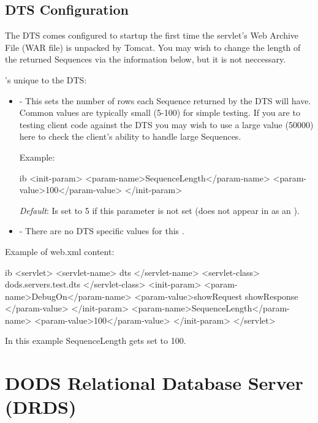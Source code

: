 \documentclass{dods-book}
\begin{document}

\subsection {DTS Configuration}

The DTS comes configured to startup the first time the servlet's Web Archive File 
(WAR file) is unpacked by Tomcat. You may wish to change the length of the 
returned Sequences via the information below, but it is not neccessary.

's unique to the DTS:


\begin{itemize}

\item {} - This  sets the number of rows each 
Sequence returned by the DTS will have. Common values are typically small 
(5-100) for simple testing. If you are to testing client code against the DTS you 
may wish to use a large value (\lit{>}50000) here to check the client's ability to 
handle large Sequences. 

Example:
\begin{vcode}{ib}
<init-param>
	<param-name>SequenceLength</param-name>
	<param-value>100</param-value>
</init-param>
\end{vcode}
	
\emph{Default}: Is set to 5 if this parameter is not set (does not appear in as an 
). 

\item {} - There are no DTS specific values for this .
\end{itemize}


Example of web.xml content:

\begin{vcode}{ib}
<servlet>
	<servlet-name>
		dts
 	</servlet-name>
	<servlet-class>
		dods.servers.test.dts
	</servlet-class>
	<init-param>
		<param-name>DebugOn</param-name>
		<param-value>showRequest showResponse </param-value>
	</init-param>
		<param-name>SequenceLength</param-name>
		<param-value>100</param-value>
	</init-param>
</servlet> 
\end{vcode}

In this example SequenceLength gets set to 100.


\section{DODS Relational Database Server (DRDS)}
\end{document}
